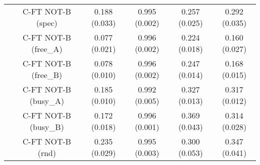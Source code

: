 \begin{table}[h]
{\begin{tabular}{cccccc}
 & C-FT NOT-B (spec)         & 0.188 (0.033) & 0.995 (0.002) & 0.257 (0.025) & 0.292 (0.035) \\ 
 & C-FT NOT-B (free_A)       & 0.077 (0.021) & 0.996 (0.002) & 0.224 (0.018) & 0.160 (0.027) \\ 
 & C-FT NOT-B (free_B)       & 0.078 (0.010) & 0.996 (0.002) & 0.247 (0.014) & 0.168 (0.015) \\ 
 & C-FT NOT-B (busy_A)       & 0.185 (0.010) & 0.992 (0.005) & 0.327 (0.013) & 0.317 (0.012) \\ 
 & C-FT NOT-B (busy_B)       & 0.172 (0.018) & 0.996 (0.001) & 0.369 (0.043) & 0.314 (0.028) \\ 
 & C-FT NOT-B (rnd)          & 0.235 (0.029) & 0.995 (0.003) & 0.300 (0.053) & 0.347 (0.041) \\ \bottomrule
\end{tabular}
}
\end{table}
